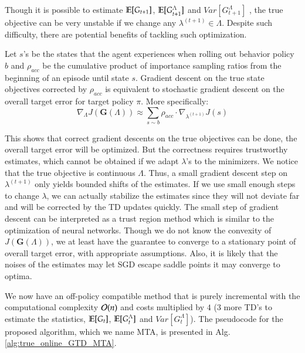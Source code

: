 \documentclass{article}
\begin{document}
\par
Though it is possible to estimate $\mathbb{E}[G_{t+1}]$, $\mathbb{E}[G_{t+1}^\Lambda]$ and $Var[G_{t+1}^\Lambda]$ \cite{sherstan2018directly}, the true objective can be very unstable if we change any $\lambda^{(t+1)} \in \Lambda$. Despite such difficulty, there are potential benefits of tackling such optimization.

\begin{theorem}\label{thm:nongreedy}
Let $s$'s be the states that the agent experiences when rolling out behavior policy $b$ and $\rho_{acc}$ be the cumulative product of importance sampling ratios from the beginning of an episode until state $s$. Gradient descent on the true state objectives corrected by $\rho_{acc}$ is equivalent to stochastic gradient descent on the overall target error for target policy $\pi$. More specifically:
\begin{equation}
\nonumber
\nabla_{\Lambda} J(\bm{G}(\Lambda)) \approx \sum_{s \sim b}{\rho_{acc} \cdot \nabla_{\lambda^{(t+1)}} J(s)}
\end{equation}
\end{theorem}

This shows that correct gradient descents on the true objectives can be done, the overall target error will be optimized. But the correctness requires trustworthy estimates, which cannot be obtained if we adapt $\lambda$'s to the minimizers. We notice that the true objective is continuous \wrt{} $\Lambda$. Thus, a small gradient descent step on $\lambda^{(t+1)}$ only yields bounded shifts of the estimates. If we use small enough steps to change $\lambda$, we can actually stabilize the estimates since they will not deviate far and will be corrected by the TD updates quickly. The small step of gradient descent can be interpreted as a trust region method which is similar to the optimization of neural networks. Though we do not know the convexity of $J(\bm{G}(\Lambda))$, we at least have the guarantee to converge to a stationary point of overall target error, with appropriate assumptions. Also, it is likely that the noises of the estimates may let SGD escape saddle points \st{} it may converge to optima.
\par
We now have an off-policy compatible method that is purely incremental with the computational complexity $\mathcal{O}(n)$ and costs multiplied by $4$ ($3$ more TD's to estimate the statistics, \ie{} $\mathbb{E}[G_t]$, $\mathbb{E}[G_t^\Lambda]$ and $Var[G_t^\Lambda]$). The pseudocode for the proposed algorithm, which we name MTA, is presented in Alg. \ref{alg:true_online_GTD_MTA}.
\end{document}
